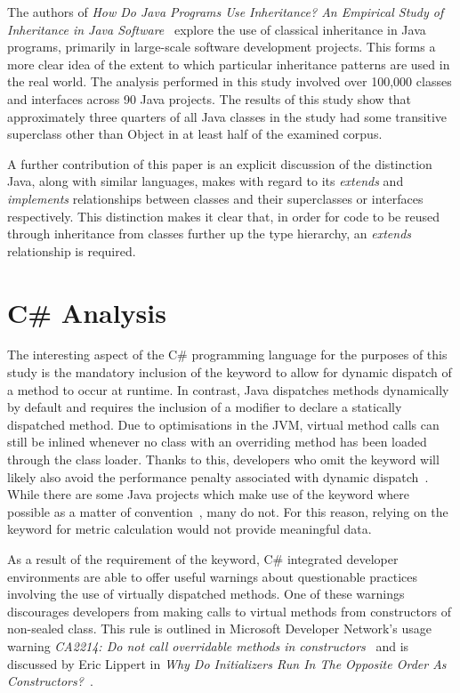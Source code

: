 The authors of \textit{How Do Java Programs Use Inheritance? An Empirical Study of Inheritance in Java Software}~\cite{HowProgramsUseInheritance} explore the use of classical inheritance in Java programs, primarily in large-scale software development projects. This forms a more clear idea of the extent to which particular inheritance patterns are used in the real world. The analysis performed in this study involved over 100,000 classes and interfaces across 90 Java projects. The results of this study show that approximately three quarters of all Java classes in the study had some transitive superclass other than Object in at least half of the examined corpus.
\newline

A further contribution of this paper is an explicit discussion of the distinction Java, along with similar languages, makes with regard to its \textit{extends} and \textit{implements} relationships between classes and their superclasses or interfaces respectively. This distinction makes it clear that, in order for code to be reused through inheritance from classes further up the type hierarchy, an \textit{extends} relationship is required.

\section{C\# Analysis}
\label{CSharpLit}
The interesting aspect of the C\# programming language for the purposes of this study is the mandatory inclusion of the  keyword to allow for dynamic dispatch of a method to occur at runtime. In contrast, Java dispatches methods dynamically by default and requires the inclusion of a  modifier to declare a statically dispatched method. Due to optimisations in the JVM, virtual method calls can still be inlined whenever no class with an overriding method has been loaded through the class loader. Thanks to this, developers who omit the  keyword will likely also avoid the performance penalty associated with dynamic dispatch~\cite{JavaInlining}. While there are some Java projects which make use of the  keyword where possible as a matter of convention~\cite{FinalConvention}, many do not. For this reason, relying on the keyword for metric calculation would not provide meaningful data.
\newline

As a result of the requirement of the  keyword, C\# integrated developer environments are able to offer useful warnings about questionable practices involving the use of virtually dispatched methods. One of these warnings discourages developers from making calls to virtual methods from constructors of non-sealed class. This rule is outlined in Microsoft Developer Network's usage warning \textit{CA2214: Do not call overridable methods in constructors}~\cite{OverridableMethodWarning} and is discussed by Eric Lippert in \textit{Why Do Initializers Run In The Opposite Order As Constructors?}~\cite{NoDowncalls}.
\newline

